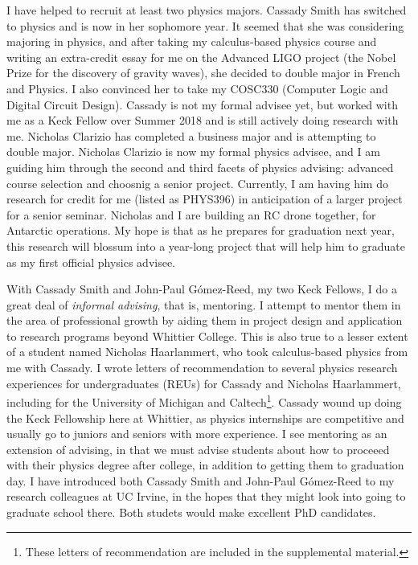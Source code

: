 \documentclass[../main.tex]{subfiles}
\begin{document}
I have helped to recruit at least two physics majors.  Cassady Smith has switched to physics and is now in her sophomore year.  It seemed that she was considering majoring in physics, and after taking my calculus-based physics course and writing an extra-credit essay for me on the Advanced LIGO project (the Nobel Prize for the discovery of gravity waves), she decided to double major in French and Physics.  I also convinced her to take my COSC330 (Computer Logic and Digital Circuit Design).  Cassady is not my formal advisee yet, but worked with me as a Keck Fellow over Summer 2018 and is still actively doing research with me.  Nicholas Clarizio has completed a business major and is attempting to double major.  Nicholas Clarizio is now my formal physics advisee, and I am guiding him through the second and third facets of physics advising: advanced course selection and choosnig a senior project.  Currently, I am having him do research for credit for me (listed as PHYS396) in anticipation of a larger project for a senior seminar.  Nicholas and I are building an RC drone together, for Antarctic operations.  My hope is that as he prepares for graduation next year, this research will blossum into a year-long project that will help him to graduate as my first official physics advisee. \\ \hspace{0.1cm}

With Cassady Smith and John-Paul G\'{o}mez-Reed, my two Keck Fellows, I do a great deal of \textit{informal advising}, that is, mentoring.  I attempt to mentor them in the area of professional growth by aiding them in project design and application to research programs beyond Whittier College.  This is also true to a lesser extent of a student named Nicholas Haarlammert, who took calculus-based physics from me with Cassady.  I wrote letters of recommendation to several physics research experiences for undergraduates (REUs) for Cassady and Nicholas Haarlammert, including for the University of Michigan and Caltech\footnote{These letters of recommendation are included in the supplemental material.}.  Cassady wound up doing the Keck Fellowship here at Whittier, as physics internships are competitive and usually go to juniors and seniors with more experience.  I see mentoring as an extension of advising, in that we must advise students about how to proceeed with their physics degree after college, in addition to getting them to graduation day.  I have introduced both Cassady Smith and John-Paul G\'{o}mez-Reed to my research colleagues at UC Irvine, in the hopes that they might look into going to graduate school there.  Both studets would make excellent PhD candidates.
\end{document}
